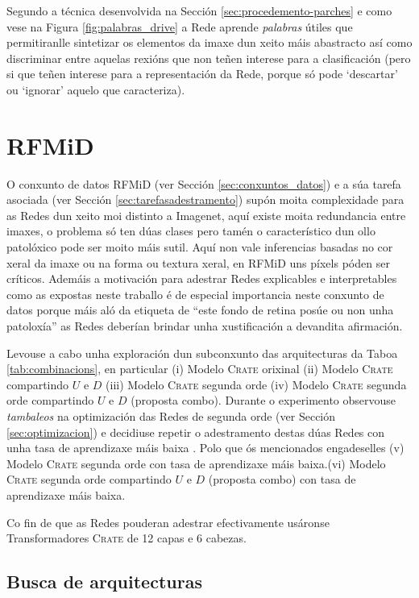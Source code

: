 Segundo a técnica desenvolvida na Sección \ref{sec:procedemento-parches} e como vese na Figura \ref{fig:palabras_drive} a Rede aprende \emph{palabras} útiles que permitiranlle sintetizar os elementos da imaxe dun xeito máis abastracto así como discriminar entre aquelas rexións que non teñen interese para a clasificación (pero si que teñen interese para a representación da Rede, porque só pode `descartar' ou `ignorar' aquelo que caracteriza).

\section{RFMiD}
\label{sec:res-rfmid}

O conxunto de datos RFMiD (ver Sección \ref{sec:conxuntos_datos}) e a súa tarefa asociada (ver Sección \ref{sec:tarefasadestramento}) supón moita complexidade para as Redes dun xeito moi distinto a Imagenet, aquí existe moita redundancia entre imaxes, o problema só ten dúas clases pero tamén o característico dun ollo patolóxico pode ser moito máis sutil. Aquí non vale inferencias basadas no cor xeral da imaxe ou na forma ou textura xeral, en RFMiD uns \glspl{píxel} póden ser críticos. Ademáis a motivación para adestrar Redes explicables e interpretables como as expostas neste traballo é de especial importancia neste conxunto de datos porque máis aló da etiqueta de ``este fondo de retina posúe ou non unha patoloxía'' as Redes deberían brindar unha xustificación a devandita afirmación.

Levouse a cabo unha exploración dun subconxunto das arquitecturas da Taboa \ref{tab:combinacions}, en particular (i) Modelo \textsc{Crate} orixinal (ii) Modelo \textsc{Crate} compartindo $U$ e $D$ (iii) Modelo \textsc{Crate} segunda orde (iv) Modelo \textsc{Crate} segunda orde compartindo $U$ e $D$ (proposta combo). Durante o experimento observouse \emph{tambaleos} na optimización das Redes de segunda orde (ver Sección \ref{sec:optimizacion}) e decidiuse repetir o adestramento destas dúas Redes con unha \gls{tasa de aprendizaxe} máis baixa . Polo que ós mencionados engadeselles (v) Modelo \textsc{Crate} segunda orde con \gls{tasa de aprendizaxe} máis baixa.(vi) Modelo \textsc{Crate} segunda orde compartindo $U$ e $D$ (proposta combo) con \gls{tasa de aprendizaxe} máis baixa.

Co fin de que as Redes pouderan adestrar efectivamente usáronse Transformadores \textsc{Crate} de 12 capas e 6 cabezas.

\subsection{Busca de arquitecturas}
\label{sec:res-bus-rfmid}

